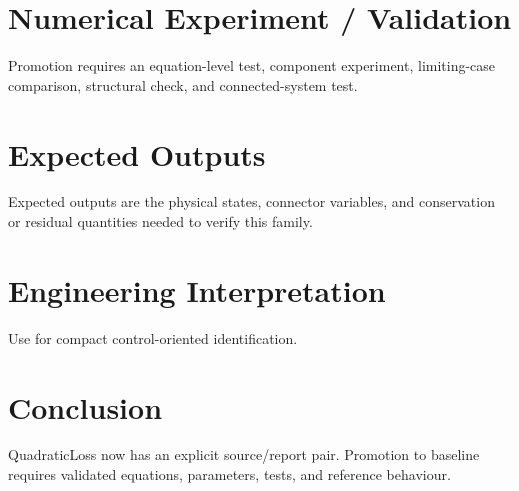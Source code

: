 \documentclass[10pt,a4paper]{article}
\begin{document}
\section{Numerical Experiment / Validation}Promotion requires an equation-level test, component experiment, limiting-case comparison, structural check, and connected-system test.
\section{Expected Outputs}Expected outputs are the physical states, connector variables, and conservation or residual quantities needed to verify this family.
\section{Engineering Interpretation}Use for compact control-oriented identification.
\section*{Conclusion}QuadraticLoss now has an explicit source/report pair. Promotion to baseline requires validated equations, parameters, tests, and reference behaviour.
\end{document}
